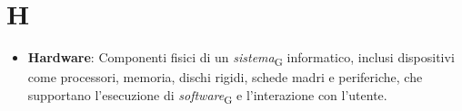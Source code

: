 \section{H}
\begin{itemize}
    \item \textbf{Hardware}: Componenti fisici di un \textit{sistema}\textsubscript{G} informatico, inclusi dispositivi come processori, memoria, dischi rigidi, schede madri e periferiche, che supportano l'esecuzione di \textit{software}\textsubscript{G} e l'interazione con l'utente.
\end{itemize}
